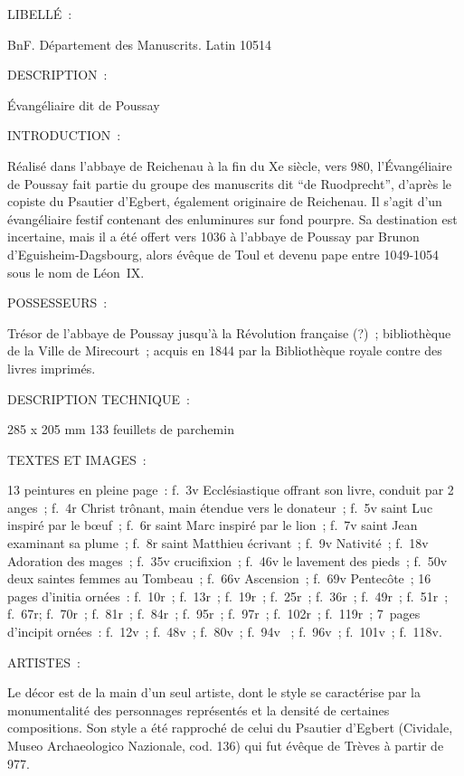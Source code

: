 \begin{mdframed}[style=graybox]
	LIBELLÉ~:\par
	BnF. Département des Manuscrits. Latin 10514\par
	DESCRIPTION~:\par
	Évangéliaire dit de Poussay\par
	INTRODUCTION~:\par
	Réalisé dans l’abbaye de Reichenau à la fin du Xe siècle, vers 980, l’Évangéliaire de Poussay fait partie du groupe des manuscrits dit \enquote{de Ruodprecht}, d’après le copiste du Psautier d’Egbert, également originaire de Reichenau. Il s’agit d’un évangéliaire festif contenant des enluminures sur fond pourpre. Sa destination est incertaine, mais il a été offert vers 1036 à l’abbaye de Poussay par Brunon d’Eguisheim-Dagsbourg, alors évêque de Toul et devenu pape entre 1049-1054 sous le nom de Léon~IX.\par
	POSSESSEURS~:\par
	Trésor de l’abbaye de Poussay jusqu’à la Révolution française (?)~; bibliothèque de la Ville de Mirecourt~; acquis en 1844 par la Bibliothèque royale contre des livres imprimés.\par
	DESCRIPTION TECHNIQUE~:\par
	285 x 205 mm 133 feuillets de parchemin\par
	TEXTES ET IMAGES~:\par
	13 peintures en pleine page~: f.~3v Ecclésiastique offrant son livre, conduit par 2 anges~; f.~4r Christ trônant, main étendue vers le donateur~; f.~5v saint Luc inspiré par le bœuf~; f.~6r saint Marc inspiré par le lion~; f.~7v saint Jean examinant sa plume~; f.~8r saint Matthieu écrivant~; f.~9v Nativité~; f.~18v Adoration des mages~; f.~35v crucifixion~; f.~46v le lavement des pieds~; f.~50v deux saintes femmes au Tombeau~; f.~66v Ascension~; f.~69v Pentecôte~; 16 pages d’initia ornées~: f.~10r~; f.~13r~; f.~19r~; f.~25r~; f.~36r~; f.~49r~; f.~51r~; f.~67r; f.~70r~; f.~81r~; f.~84r~; f.~95r~; f.~97r~; f.~102r~; f.~119r~; 7~pages d’incipit ornées~: f.~12v~; f.~48v~; f.~80v~; f.~94v ~; f.~96v~; f.~101v~; f.~118v.\par
	ARTISTES~:\par
	Le décor est de la main d’un seul artiste, dont le style se caractérise par la monumentalité des personnages représentés et la densité de certaines compositions. Son style a été rapproché de celui du Psautier d’Egbert (Cividale, Museo Archaeologico Nazionale, cod. 136) qui fut évêque de Trèves à partir de 977.\par

\end{mdframed}
